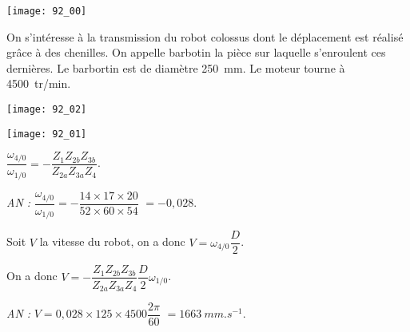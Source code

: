 \normaltrue \difficilefalse \tdifficilefalse
\correctionfalse


\setcounter{question}{0}


\ifcorrection
\else
{}
\fi

\ifprof
\else


\begin{marginfigure}
\texttt{[image: 92\_00]}
\end{marginfigure}
On s'intéresse à la transmission du robot colossus dont le déplacement est réalisé grâce à des chenilles. On appelle barbotin la pièce sur laquelle s'enroulent ces dernières. Le barbortin est de diamètre \SI{250}{mm}.
Le moteur tourne à \SI{4500}{tr/min}.

\begin{marginfigure}
\texttt{[image: 92\_02]}
\end{marginfigure}

\begin{marginfigure}
\texttt{[image: 92\_01]}
\end{marginfigure}


\fi




\ifprof
\begin{corrige}
$\dfrac{\omega_{4/0}}{\omega_{1/0}}  = - \dfrac{Z_1 Z_{2b}Z_{3b}}{Z_{2a}Z_{3a}Z_{4}}$.

\textit{AN :} $\dfrac{\omega_{4/0}}{\omega_{1/0}}  = - \dfrac{14\times  17 \times 20}{52 \times 60 \times 54}$ $= - 0,028$.
\end{corrige}
\else
\fi




\ifprof
\begin{corrige}
Soit $V$ la vitesse du robot, on a donc $V = \omega_{4/0} \dfrac{D}{2}$.

On a donc $V = - \dfrac{Z_1 Z_{2b}Z_{3b}}{Z_{2a}Z_{3a}Z_{4}}  \dfrac{D}{2} \omega_{1/0}$.

\textit{AN :} $V = 0,028 \times 125 \times 4500\dfrac{2\pi}{60}$ $=\SI{1663}{mm.s^{-1}}$. 
\end{corrige}
\else
\fi





\ifprof
\else


\fi